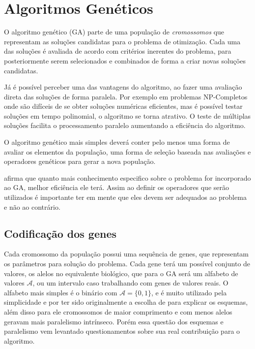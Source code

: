 
\chapter{Algoritmos Genéticos}
\label{chap:GA}

O algoritmo genético (GA) parte de uma população de \textit{cromossomos} que representam as soluções candidatas para o problema de otimização. Cada uma das soluções é avaliada de acordo com critérios inerentes do problema, para posteriormente serem selecionados e combinados de forma a criar novas soluções candidatas.

Já é possível perceber uma das vantagens do algoritmo, ao fazer uma avaliação direta das soluções de forma paralela. Por exemplo em problemas NP-Completos onde são difíceis de se obter soluções numéricas eficientes, mas é possível testar soluções em tempo polinomial, o algoritmo se torna atrativo. O teste de múltiplas soluções facilita o processamento paralelo aumentando a eficiência do algoritmo.

O algoritmo genético mais simples deverá conter pelo menos uma forma de avaliar os elementos da população, uma forma de seleção baseada nas avaliações e operadores genéticos para gerar a nova população.

\citeauthor{Linden2008} afirma que quanto mais conhecimento especifico sobre o problema for incorporado ao GA, melhor eficiência ele terá. Assim ao definir os operadores que serão utilizados é importante ter em mente que eles devem ser adequados ao problema e não ao contrário.

\section{Codificação dos genes}
Cada cromossomo da população possui uma sequência de genes, que representam os parâmetros para solução do problema. Cada gene terá um possível conjunto de valores, os alelos no equivalente biológico, que para o GA será um alfabeto de valores \( \mathcal{A}\), ou um intervalo caso trabalhando com genes de valores reais. O alfabeto mais simples é o binário com \(\mathcal{A} = \{0, 1\}\), e é muito utilizado pela simplicidade e por ter sido originalmente a escolha de \citeauthor{Holland1992} para explicar os esquemas, além disso para ele cromossomos de maior comprimento e com menos alelos geravam mais paralelismo intrínseco. Porém essa questão dos esquemas e paralelismo vem levantado questionamentos sobre sua real contribuição para o algoritmo. 

